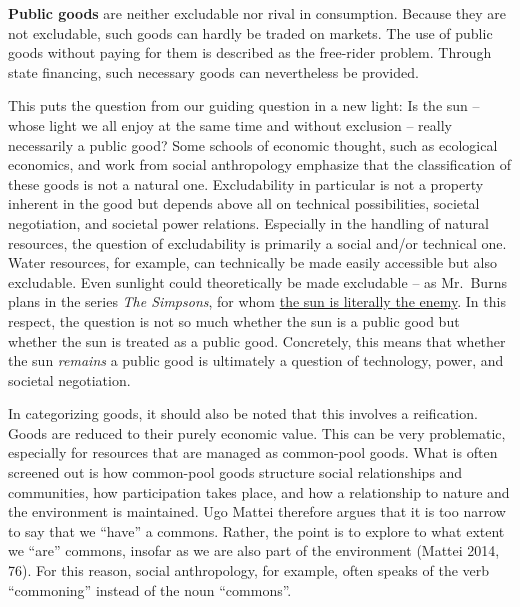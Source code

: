 \documentclass[
  british,
  a4paper,
  DIV=11,
  numbers=noendperiod,
  oneside,
  openany]{scrreprt}
\begin{document}
\textbf{Public goods} are neither excludable nor rival in consumption.
Because they are not excludable, such goods can hardly be traded on
markets. The use of public goods without paying for them is described as
the free-rider problem. Through state financing, such necessary goods
can nevertheless be provided.

This puts the question from our guiding question in a new light: Is the
sun -- whose light we all enjoy at the same time and without exclusion
-- really necessarily a public good? Some schools of economic thought,
such as ecological economics, and work from social anthropology
emphasize that the classification of these goods is not a natural one.
Excludability in particular is not a property inherent in the good but
depends above all on technical possibilities, societal negotiation, and
societal power relations. Especially in the handling of natural
resources, the question of excludability is primarily a social and/or
technical one. Water resources, for example, can technically be made
easily accessible but also excludable. Even sunlight could theoretically
be made excludable -- as Mr.~Burns plans in the series \emph{The
Simpsons}, for whom
\href{https://www.youtube.com/watch?v=L3LbxDZRgA4}{the sun is literally
the enemy}. In this respect, the question is not so much whether the sun
is a public good but whether the sun is treated as a public good.
Concretely, this means that whether the sun \emph{remains} a public good
is ultimately a question of technology, power, and societal negotiation.

In categorizing goods, it should also be noted that this involves a
reification. Goods are reduced to their purely economic value. This can
be very problematic, especially for resources that are managed as
common-pool goods. What is often screened out is how common-pool goods
structure social relationships and communities, how participation takes
place, and how a relationship to nature and the environment is
maintained. Ugo Mattei therefore argues that it is too narrow to say
that we ``have'' a commons. Rather, the point is to explore to what
extent we ``are'' commons, insofar as we are also part of the
environment (Mattei 2014, 76). For this reason, social anthropology, for
example, often speaks of the verb ``commoning'' instead of the noun
``commons''.
\end{document}
